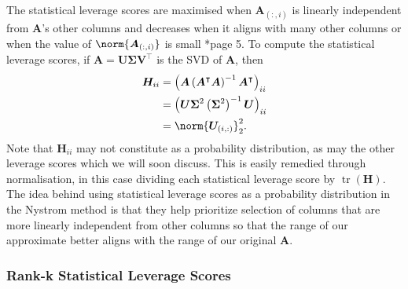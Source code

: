 The statistical leverage scores are maximised when $\bm{A}_{(:,i)}$ is linearly independent from $\bm{A}$'s other columns and decreases when it aligns with many other columns or when the value of $\norm{\bm{A}_{(:,i)}}$ is small \cite{DBLP:journals/corr/CohenMM15}*{page 5}. To compute the statistical leverage scores, if $\bm{A} = \bm{U} \bm{\Sigma} \bm{V}^{\intercal}$ is the SVD of $\bm{A}$, then
\begin{align*}
    \bm{H}_{ii} & = \left( \bm{A} \left( \bm{A}^{\intercal} \bm{A} \right)^{-1} \bm{A}^{\intercal} \right)_{ii} \\
                & = \left( \bm{U} \bm{\Sigma}^{2} \left( \bm{\Sigma}^{2} \right)^{-1} \bm{U} \right)_{ii}       \\
                & = \norm{\bm{U}_{(i,:)}}_2^2.
\end{align*}
Note that $\bm{H}_{ii}$ may not constitute as a probability distribution, as may the other leverage scores which we will soon discuss. This is easily remedied through normalisation, in this case dividing each statistical leverage score by $\operatorname{tr} \left( \bm{H} \right)$. The idea behind using statistical leverage scores as a probability distribution in the Nystrom method is that they help prioritize selection of columns that are more linearly independent from other columns so that the range of our approximate better aligns with the range of our original $\bm{A}$.

\subsubsection{Rank-k Statistical Leverage Scores}

